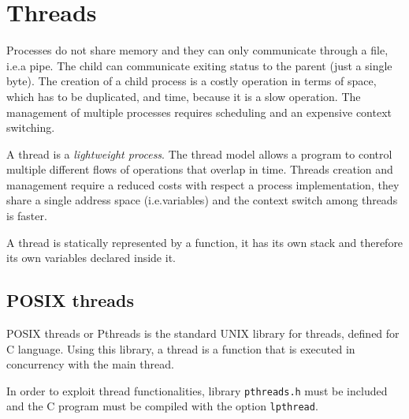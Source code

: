 \chapter{Threads}
Processes do not share memory and they can only communicate through a file, i.e.\@ a pipe. The child can communicate exiting status to the parent (just a single byte). The creation of a child process is a costly operation in terms of space, which has to be duplicated, and time, because it is a slow operation. The management of multiple processes requires scheduling and an expensive context switching.

A thread is a \textit{lightweight process}. The thread model allows a program to control multiple different flows of operations that overlap in time. Threads creation and management require a reduced costs with respect a process implementation, they share a single address space (i.e.\@ variables) and the context switch among threads is faster.

A thread is statically represented by a function, it has its own stack and therefore its own variables declared inside it.

\section{POSIX threads}
POSIX threads or Pthreads is the standard UNIX library for threads, defined for C language. Using this library, a thread is a function that is executed in concurrency with the main thread.

In order to exploit thread functionalities, library \texttt{pthreads.h} must be included and the C program must be compiled with the option \texttt{lpthread}.

